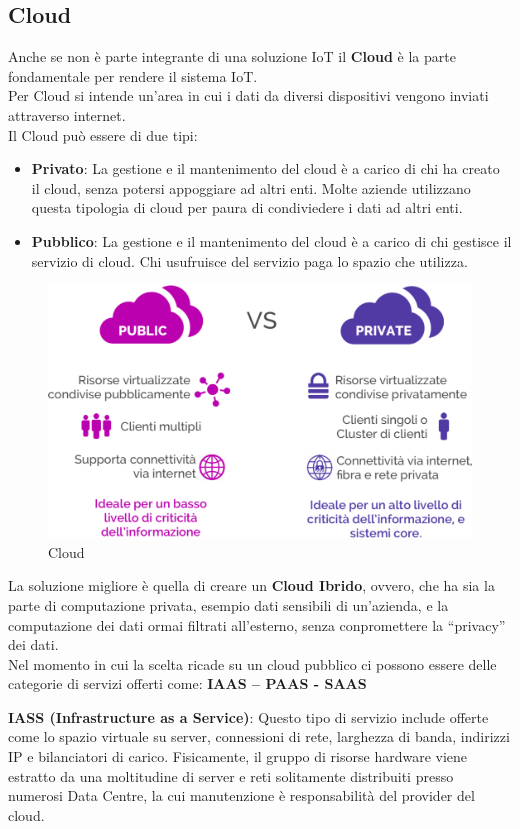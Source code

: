 \documentclass[10pt,a4paper,oneside]{scrbook}
\begin{document}
\subsection{Cloud}
Anche se non è parte integrante di una soluzione IoT il \textbf{Cloud} è la parte fondamentale per rendere il sistema IoT.\\
Per Cloud si intende un'area in cui i dati da diversi dispositivi vengono inviati attraverso internet.\\
Il Cloud può essere di due tipi:
\begin{itemize}
    \item \textbf{Privato}: La gestione e il mantenimento del cloud è a carico di chi ha creato il cloud, senza potersi appoggiare ad altri enti. Molte aziende utilizzano questa tipologia di cloud per paura di condiviedere i dati ad altri enti. 
    \item \textbf{Pubblico}: La gestione e il mantenimento del cloud è a carico di chi gestisce il servizio di cloud. Chi usufruisce del servizio paga lo spazio che utilizza.
\end{itemize}
\begin{figure}[h]
    \centering
    \includegraphics[width=0.6\linewidth]{img/Cloud.png}
    \caption{Cloud}
    \label{fig:Cloud}
\end{figure}
La soluzione migliore è quella di creare un \textbf{Cloud Ibrido}, ovvero, che ha sia la parte di computazione privata, esempio dati sensibili di un'azienda, e la computazione dei dati ormai filtrati all'esterno, senza conpromettere la ``privacy'' dei dati.\\
Nel momento in cui la scelta ricade su un cloud pubblico ci possono essere delle categorie di servizi offerti come: \textbf{IAAS – PAAS - SAAS}

\textbf{IASS (Infrastructure as a Service)}: Questo tipo di servizio include offerte come lo spazio virtuale su server, connessioni di rete, larghezza di banda, indirizzi IP e bilanciatori di carico. Fisicamente, il gruppo di risorse hardware viene estratto da una moltitudine di server e reti solitamente distribuiti presso numerosi Data Centre, la cui manutenzione è responsabilità del provider del cloud.
\end{document}
